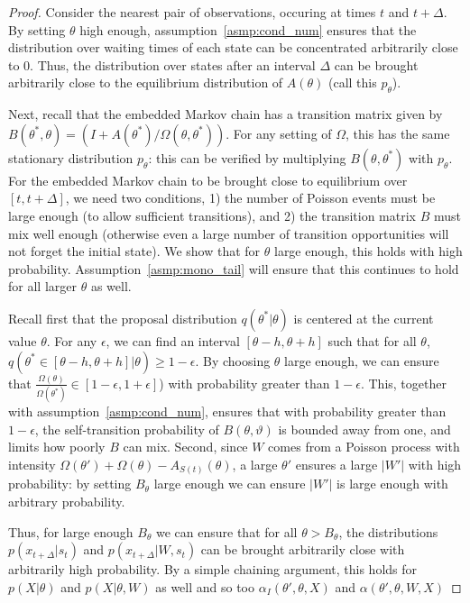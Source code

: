 \begin{proof}
Consider the nearest pair of observations, occuring at times $t$ and 
$t + \Delta$. %
By setting $\theta$ high enough, assumption~\ref{asmp:cond_num} ensures 
that the distribution over waiting times of each state can be concentrated 
arbitrarily close to $0$. Thus, the distribution over states after an 
interval $\Delta$ can be brought arbitrarily close to the equilibrium 
distribution of $A(\theta)$  (call this $p_{\theta}$).

Next, recall that the embedded Markov chain has a transition matrix 
given by $B(\theta^*,\theta) = (I + A(\theta^*)/\Omega(\theta,\theta^*))$. 
For any setting of $\Omega$, this has the same stationary distribution 
$p_{\theta}$: this can be verified by multiplying $B(\theta,\theta^*)$ with 
$p_\theta$. For the embedded Markov chain to be brought close to 
equilibrium over $[t,t+\Delta]$, we need two conditions, 1) the number of 
Poisson events must be large enough (to allow sufficient transitions), and 2) the 
transition matrix $B$ must mix well enough (otherwise even a 
large number of transition opportunities will not forget the initial state). 
We show that for $\theta$ large enough, this holds with high probability.
Assumption~\ref{asmp:mono_tail} will ensure that this continues to hold 
for all larger $\theta$ as well.

Recall first that the proposal distribution $q(\theta^*|\theta)$ is 
centered at the current value $\theta$. For any $\epsilon$, we can find 
an interval $[\theta-h,\theta+h]$ such that for all $\theta$, 
$q(\theta^* \in [\theta-h,\theta+h]|\theta)
\ge 1-\epsilon$. By choosing $\theta$ large 
enough, we can ensure that %
$\frac{\Omega(\theta)}{ \Omega(\theta^*)} \in [1-\epsilon,1+\epsilon]$) 
with probability greater than $1-\epsilon$.
This, together with assumption~\ref{asmp:cond_num}, ensures that with 
probability greater than $1-\epsilon$, the self-transition probability of $B(\theta,\vartheta)$ 
is bounded away from one, and limits how poorly $B$ can mix.
Second, since $W$ comes from a Poisson process with intensity 
$\Omega(\theta')+ \Omega(\theta) - A_{S(t)}(\theta)$, a large $\theta'$
ensures a large $|W'|$ with high probability: by setting $B_\theta$ large 
enough we can ensure $|W'|$ is large enough with arbitrary probability.

Thus, for large enough $B_\theta$ we can ensure that for all $\theta > 
B_\theta$, the distributions $p(x_{t+\Delta}|s_t)$ and 
$p(x_{t+\Delta}|W,s_t)$ can be brought arbitrarily close with arbitrarily 
high probability.  
By a simple chaining argument, this holds for $p(X|\theta)$ and 
$p(X|\theta,W)$ as well and so too 
$\alpha_I(\theta',\theta,X)$ and $\alpha(\theta',\theta,W,X)$
\end{proof}

